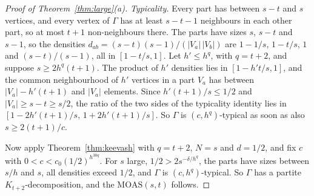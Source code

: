 \documentclass[11pt]{amsart}
\theoremstyle{definition}\newtheorem{definition}[theorem]{Definition}
\theoremstyle{remark}\newtheorem{remark}[theorem]{Remark}
\newcommand{\MOAS}{\mathrm{MOAS}}
\begin{document}
\begin{proof}[Proof of Theorem~\ref{thm:large}(a)]
\emph{Typicality.} Every part has between $s-t$ and $s$ vertices, and every vertex of $\Gamma$ has at least $s-t-1$
neighbours in each other part, so at most $t+1$ non-neighbours there. The parts have sizes $s$, $s-t$ and $s-1$, so the
densities $d_{ab}=(s-t)(s-1)/(|V_a|\,|V_b|)$ are $1-1/s$, $1-t/s$, $1$ and $(s-t)/(s-1)$, all in $[1-t/s,1]$. Let
$h'\le h^q$, with $q=t+2$, and suppose $s\ge2h^q(t+1)$. The product of $h'$ densities lies in $[1-h't/s,1]$, and the
common neighbourhood of $h'$ vertices in a part $V_a$ has between $|V_a|-h'(t+1)$ and $|V_a|$ elements. Since
$h'(t+1)/s\le1/2$ and $|V_a|\ge s-t\ge s/2$, the ratio of the two sides of the typicality identity lies in $[1-2h'(t+1)/s,\,1+2h'(t+1)/s]$. So
$\Gamma$ is $(c,h^q)$-typical as soon as also $s\ge2(t+1)/c$.

Now apply Theorem~\ref{thm:keevash} with $q=t+2$, $N=s$ and $d=1/2$, and fix $c$ with $0<c<c_0(1/2)^{h^{30q}}$. For
$s$ large, $1/2>2s^{-\delta/h^q}$, the parts have sizes between $s/h$ and $s$, all densities exceed $1/2$, and $\Gamma$
is $(c,h^q)$-typical. So $\Gamma$ has a partite $K_{t+2}$-decomposition, and the $\MOAS(s,t)$ follows.
\end{proof}
\end{document}
